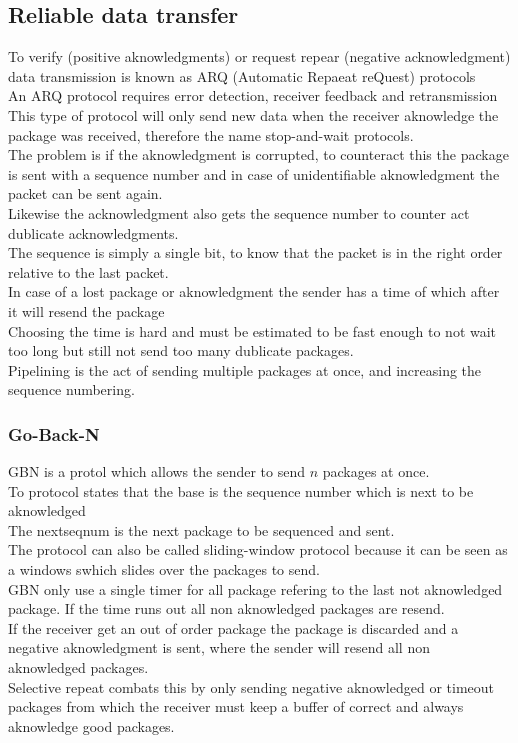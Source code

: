 \documentclass[12pt, a4paper]{article}
\begin{document}
		\subsection{Reliable data transfer}
			To verify (positive aknowledgments) or request repear (negative acknowledgment) data transmission is known as ARQ (Automatic Repaeat reQuest) protocols\\
			An ARQ protocol requires error detection, receiver feedback and retransmission\\
			This type of protocol will only send new data when the receiver aknowledge the package was received, therefore the name stop-and-wait protocols.\\
			The problem is if the aknowledgment is corrupted, to counteract this the package is sent with a sequence number and in case of unidentifiable aknowledgment the packet can be sent again.\\
			Likewise the acknowledgment also gets the sequence number to counter act dublicate acknowledgments.\\
			The sequence is simply a single bit, to know that the packet is in the right order relative to the last packet.\\
			In case of a lost package or aknowledgment the sender has a time of which after it will resend the package\\
			Choosing the time is hard and must be estimated to be fast enough to not wait too long but still not send too many dublicate packages.\\
			Pipelining is the act of sending multiple packages at once, and increasing the sequence numbering.
			\subsubsection{Go-Back-N}
				GBN is a protol which allows the sender to send $n$ packages at once.\\
				To protocol states that the base is the sequence number which is next to be aknowledged\\
				The nextseqnum is the next package to be sequenced and sent.\\
				The protocol can also be called sliding-window protocol because it can be seen as a windows swhich slides over the packages to send.\\
				GBN only use a single timer for all package refering to the last not aknowledged package. If the time runs out all non aknowledged packages are resend.\\
				If the receiver get an out of order package the package is discarded and a negative aknowledgment is sent, where the sender will resend all non aknowledged packages.\\
				Selective repeat combats this by only sending negative aknowledged or timeout packages from which the receiver must keep a buffer of correct and always aknowledge good packages.\\
\end{document}

